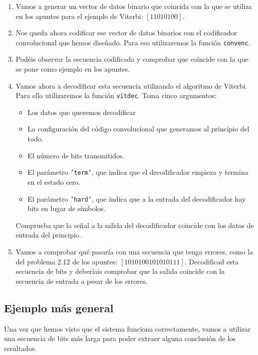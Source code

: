 \documentclass[es,practica]{uah}
\begin{document}
\begin{enumerate}
		\item Vamos a generar un vector de datos binario que coincida con la que se utiliza en los apuntes para el ejemplo de Viterbi: $[1 1 0 1 0 1 0 0 ]$.
		\item Nos queda ahora codificar ese vector de datos binarios con el codificador convolucional que hemos diseñado. Para eso utilizaremos la función \texttt{convenc}.
		\item Podéis observar la secuencia codificada y comprobar que coincide con la que se pone como ejemplo en los apuntes. 
		\item Vamos ahora a decodificar esta secuencia utilizando el algoritmo de Viterbi. Para ello utilizaremos la función \texttt{vitdec}. Toma cinco argumentos:
		\begin{itemize}
			\item Los datos que queremos decodificar
			\item La configuración del código convolucional que generamos al principio del todo.
			\item El número de bits transmitidos.
			\item El parámetro \texttt{'term'}, que indica que el decodificador empieza y termina en el estado cero. 
			\item El parámetro \texttt{'hard'}, que indica que a la entrada del decodificador hay bits en lugar de símbolos. 
		\end{itemize}
		Comprueba que la señal a la salida del decodificador coincide con los datos de entrada del principio. 

		\item Vamos a comprobar qué pasaría con una secuencia que tenga errores, como la del problema 2.12 de los apuntes: $[1 0 1 0 1 0 0 1 0 1 0 1 0 1 1 1]$. Decodificad esta secuencia de bits y deberíais comprobar que la salida coincide con la secuencia de entrada a pesar de los errores. 
	\end{enumerate}

\subsection{Ejemplo más general}
	Una vez que hemos visto que el sistema funciona correctamente, vamos a utilizar una secuencia de bits más larga para poder extraer alguna conclusión de los resultados.
\end{document}
